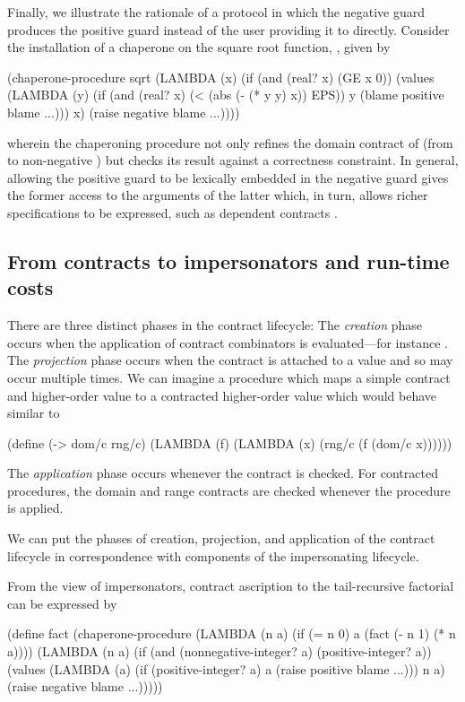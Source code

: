 Finally, we illustrate the rationale of a protocol in which the negative guard produces the positive guard instead of the user providing it to  directly.
Consider the installation of a chaperone on the square root function, , given by
\begin{schemedisplay}
(chaperone-procedure
 sqrt
 (LAMBDA (x)
   (if (and (real? x) (GE x 0))
       (values (LAMBDA (y)
                 (if (and (real? x) (< (abs (- (* y y) x)) EPS))
                     y
                     (blame positive blame ...)))
               x)
       (raise negative blame ...))))
\end{schemedisplay}
wherein the chaperoning procedure not only refines the domain contract of  (from  to non-negative ) but checks its result against a correctness constraint.
In general, allowing the positive guard to be lexically embedded in the negative guard gives the former access to the arguments of the latter which, in turn, allows richer specifications to be expressed, such as dependent contracts \cite{findler2002contracts}.

\subsection{From contracts to impersonators and run-time costs}

There are three distinct phases in the contract lifecycle:
The \emph{creation} phase occurs when the application of contract combinators is evaluated---for instance .
The \emph{projection} phase occurs when the contract is attached to a value and so may occur multiple times.
We can imagine a procedure which maps a simple contract and higher-order value to a contracted higher-order value which would behave similar to
\begin{schemedisplay}
(define (-> dom/c rng/c)
  (LAMBDA (f)
    (LAMBDA (x)
      (rng/c (f (dom/c x))))))
\end{schemedisplay}
The \emph{application} phase occurs whenever the contract is checked.
For contracted procedures, the domain and range contracts are checked whenever the procedure is applied.

We can put the phases of creation, projection, and application of the contract lifecycle in correspondence with components of the impersonating lifecycle.

From the view of impersonators, contract ascription to the tail-recursive factorial can be expressed by
\begin{schemedisplay}
(define fact (chaperone-procedure
              (LAMBDA (n a)
                (if (= n 0)
                    a
                    (fact (- n 1) (* n a))))
              (LAMBDA (n a)
                (if (and (nonnegative-integer? a)
                         (positive-integer? a))
                    (values (LAMBDA (a)
                              (if (positive-integer? a)
                                  a
                                  (raise positive blame ...)))
                            n a)
                    (raise negative blame ...)))))
\end{schemedisplay}

